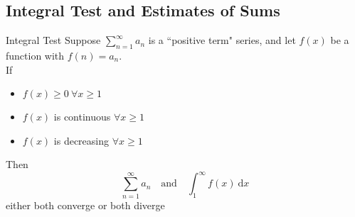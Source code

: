 \documentclass[12pt,a4paper]{article}
\def\d{{\mathrm{d}}}
\def\dx{\d x}
\begin{document}
\subsection{Integral Test and Estimates of Sums}
\begin{thm}{Integral Test}
	Suppose $\displaystyle\sum_{n=1}^{\infty}a_n$ is a ``positive term" series, and let $f(x)$ be a function with $f(n)=a_n.$\\
	If
	\begin{itemize}
		\item $f(x)\geq0\ \forall x\geq1$
		\item $f(x)$ is continuous $\forall x\geq1$
		\item $f(x)$ is decreasing $\forall x\geq1$
	\end{itemize}
	Then $$\sum_{n=1}^{\infty}a_n\quad\text{and}\quad\int_1^\infty f(x)\ \dx$$ either both converge or both diverge
\end{thm}
\end{document}
